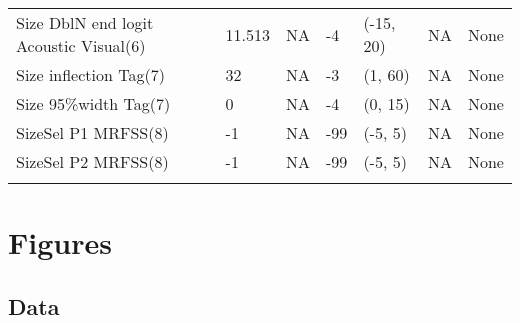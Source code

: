 \documentclass[11pt,
  letterpaper,
]{article}
\begin{document}
\begin{landscape}
\begin{longtable}[t]{>{\raggedright\arraybackslash}p{7.5cm}lllll>{\raggedright\arraybackslash}p{3.5cm}}
Size DblN end logit Acoustic Visual(6) & 11.513 & NA & -4 & (-15, 20) & NA & None\\
Size inflection Tag(7) & 32 & NA & -3 & (1, 60) & NA & None\\
Size 95\%width Tag(7) & 0 & NA & -4 & (0, 15) & NA & None\\
SizeSel P1 MRFSS(8) & -1 & NA & -99 & (-5, 5) & NA & None\\
SizeSel P2 MRFSS(8) & -1 & NA & -99 & (-5, 5) & NA & None\\*
\end{longtable}
\endgroup{}
\end{landscape}
\endgroup{}

\newpage





\newpage



\newpage



\newpage

















\newpage



\clearpage

\clearpage


\hypertarget{figures}{%
\section{Figures}\label{figures}}

\hypertarget{data}{%
\subsection{Data}\label{data}}
\end{document}
